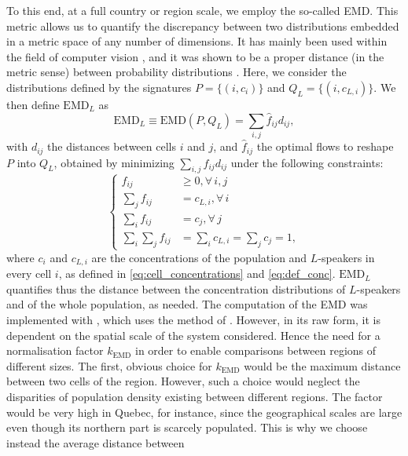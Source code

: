 \documentclass[../thesis.tex]{subfiles}
\begin{document}
To this end, at a full country or region scale, we employ the so-called \ac{EMD}. This
metric allows us to quantify the discrepancy between two distributions embedded in a
metric space of any number of dimensions. It has mainly been used within the field of
computer vision \cite{RubnerMetricDistributions1998}, and it was shown to be a proper
distance (in the metric sense) between probability distributions
\cite{LevinaEarthMover2001}. Here, we consider the distributions defined by the
signatures $P = \{ (i, c_i) \}$ and $Q_L = \{ (i, c_{L,i}) \}$. We then define
$\text{EMD}_L$ as 
\begin{equation}
\label{eq:emd_def}
  \text{EMD}_L \equiv \text{EMD}(P, Q_L) = \sum_{i,j} \hat{f}_{ij} d_{ij},
\end{equation}
with $d_{ij}$ the distances between cells $i$ and $j$, and $\hat{f}_{ij}$ the optimal
flows to reshape $P$ into $Q_L$, obtained by minimizing $\sum_{i,j} f_{ij} d_{ij}$ under
the following constraints:
\begin{equation}
  \left\{
  \begin{aligned}
    f_{ij} & \geq 0, \forall \, i,j \\
    \sum_j f_{ij} & = c_{L,i}, \forall \, i \\
    \sum_i f_{ij} & = c_j, \forall \, j \\
    \sum_{i} \sum_j f_{ij} & = \sum_i c_{L,i} = \sum_j c_j = 1,
  \end{aligned}
  \right.
\end{equation}
where $c_i$ and $c_{L,i}$ are the concentrations of the population and $L$-speakers in
every cell $i$, as defined in \cref{eq:cell_concentrations} and \cref{eq:def_conc}.
$\text{EMD}_L$ quantifies thus the distance between the concentration distributions of
$L$-speakers and of the whole population, as needed. The computation of the \ac{EMD} was
implemented with \cite{FlamaryPOTPython2021}, which uses the method of
\cite{BonneelDisplacementInterpolation2011}. However, in its raw form, it is dependent
on the spatial scale of the system considered. Hence the need for a normalisation factor
$k_\text{EMD}$ in order to enable comparisons between regions of different sizes. The
first, obvious choice for $k_\text{EMD}$ would be the maximum distance between two cells
of the region. However, such a choice would neglect the disparities of population
density existing between different regions. The factor would be very high in Quebec, for
instance, since the geographical scales are large even though its northern part is
scarcely populated. This is why we choose instead the average distance between
\end{document}
